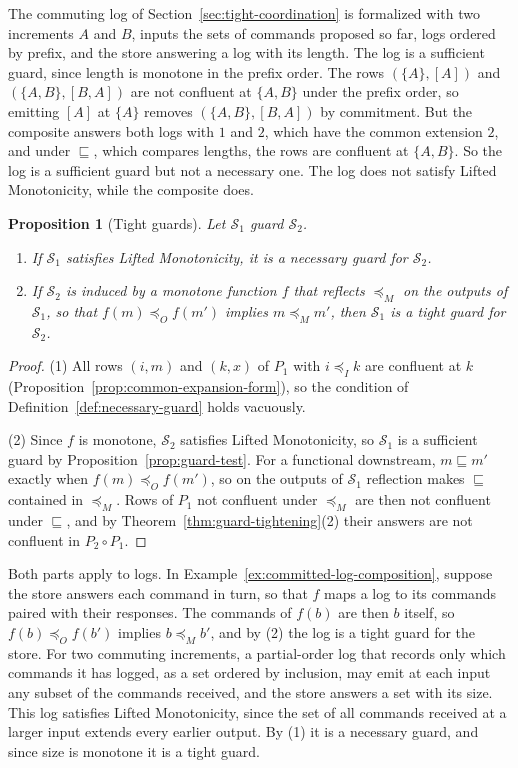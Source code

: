 \documentclass[sigconf]{cidr-2027}
\newtheorem{proposition}{Proposition}
\theoremstyle{remark}
\newcommand{\InputOrd}{\preceq_I}
\newcommand{\OutputOrd}{\preceq_O}
\newcommand{\commitment}{commitment\xspace}
\newcommand{\Spec}{\mathcal{S}}
\begin{document}
The commuting log of Section~\ref{sec:tight-coordination} is formalized with
two increments $A$ and $B$, inputs the sets of commands proposed so far, logs
ordered by prefix, and the store answering a log with its length. The
log is a sufficient guard, since length is monotone in the prefix order. The rows
$(\{A\},[A])$ and $(\{A,B\},[B,A])$ are not confluent at $\{A,B\}$ under the
prefix order, so emitting $[A]$ at $\{A\}$ removes $(\{A,B\},[B,A])$ by
\commitment. But the composite answers both logs with $1$ and $2$, which have
the common extension $2$, and under $\sqsubseteq$, which compares lengths, the
rows are confluent at $\{A,B\}$. So the log is a sufficient guard but not a necessary one. The log does
not satisfy Lifted Monotonicity, while the composite does.

\begin{proposition}[Tight guards]
\label{prop:tight-guards}
\textcolor{reviewed}{Let $\Spec_1$ guard $\Spec_2$.}
\begin{enumerate}
\item
If $\Spec_1$ satisfies Lifted Monotonicity, it is a necessary guard
        for $\Spec_2$.
\item
If $\Spec_2$ is induced by a monotone function $f$ that reflects
        $\preceq_M$ on the outputs of $\Spec_1$, so that
        $f(m)\OutputOrd f(m')$ implies $m\preceq_M m'$, then $\Spec_1$ is a
        tight guard for $\Spec_2$.
\end{enumerate}
\end{proposition}

\begin{proof}
(1) All rows $(i,m)$ and $(k,x)$ of $P_1$ with $i\InputOrd k$ are
confluent at $k$ (Proposition~\ref{prop:common-expansion-form}), so the
condition of Definition~\ref{def:necessary-guard} holds vacuously.

(2) Since $f$ is monotone, $\Spec_2$ satisfies Lifted Monotonicity, so
$\Spec_1$ is a sufficient guard by Proposition~\ref{prop:guard-test}. For a
functional downstream, $m\sqsubseteq m'$ exactly when $f(m)\OutputOrd f(m')$,
so on the outputs of $\Spec_1$ reflection makes $\sqsubseteq$ contained in
$\preceq_M$. Rows of $P_1$ not confluent under $\preceq_M$ are then
not confluent under $\sqsubseteq$, and by
Theorem~\ref{thm:guard-tightening}(2) their answers are not confluent in
$P_2\circ P_1$.
\end{proof}

Both parts apply to logs. In Example~\ref{ex:committed-log-composition},
suppose the store answers each command in turn, so that $f$ maps a log to its
commands paired with their responses. The commands of
$f(b)$ are then $b$ itself, so $f(b)\OutputOrd f(b')$ implies $b\preceq_M b'$, and
by (2) the log is a tight guard for the store. For two commuting increments,
a partial-order log that records only which commands it has logged, as a set
ordered by inclusion, may emit at each input any subset of the commands
received, and the store answers a set with its size. This log satisfies
Lifted Monotonicity, since the set of all commands received at a larger input
extends every earlier output. By (1) it is a necessary guard, and since size
is monotone it is a tight guard.
\end{document}
